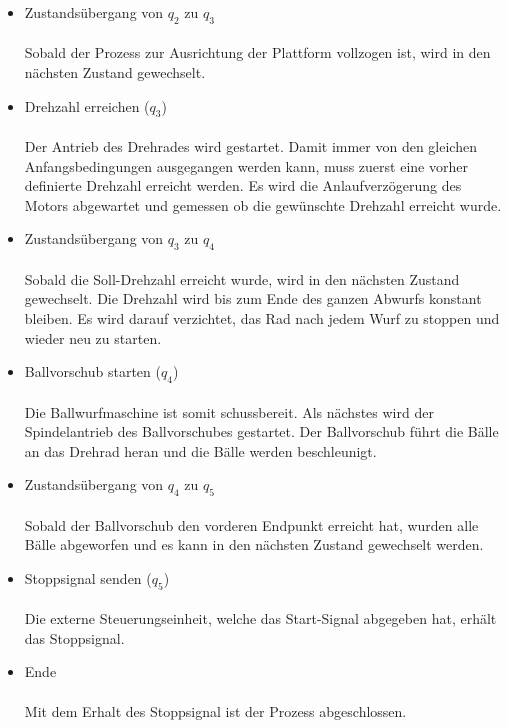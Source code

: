 \begin{itemize}
	\item Zustandsübergang von $q_{2}$ zu $q_{3}$ \\ \\
	Sobald der Prozess zur Ausrichtung der Plattform vollzogen ist, wird in den nächsten Zustand gewechselt.
	
	\item Drehzahl erreichen ($q_{3}$) \\ \\
	Der Antrieb des Drehrades wird gestartet. Damit immer von den gleichen Anfangsbedingungen ausgegangen werden kann, muss zuerst eine vorher definierte Drehzahl erreicht werden. Es wird die Anlaufverzögerung des Motors abgewartet und gemessen ob die gewünschte Drehzahl erreicht wurde.
	
	\item Zustandsübergang von $q_{3}$ zu $q_{4}$ \\ \\
	Sobald die Soll-Drehzahl erreicht wurde, wird in den nächsten Zustand gewechselt. Die Drehzahl wird bis zum Ende des ganzen Abwurfs konstant bleiben. Es wird darauf verzichtet, das Rad nach jedem Wurf zu stoppen und wieder neu zu starten.
	
	\item Ballvorschub starten ($q_{4}$) \\ \\
	Die Ballwurfmaschine ist somit schussbereit. Als nächstes wird der Spindelantrieb des Ballvorschubes gestartet. Der Ballvorschub führt die Bälle an das Drehrad heran und die Bälle werden beschleunigt. 
	
	\item Zustandsübergang von $q_{4}$ zu $q_{5}$ \\ \\
	Sobald der Ballvorschub den vorderen Endpunkt erreicht hat, wurden alle Bälle abgeworfen und es kann in den nächsten Zustand gewechselt werden.
	
	\item Stoppsignal senden ($q_{5}$) \\ \\
	Die externe Steuerungseinheit, welche das Start-Signal abgegeben hat, erhält das Stoppsignal.
	
	\item Ende \\ \\
	Mit dem Erhalt des Stoppsignal ist der Prozess abgeschlossen.
	
\end{itemize}


